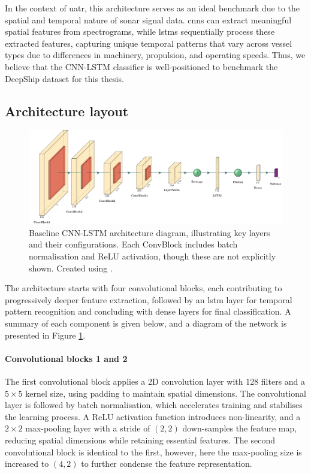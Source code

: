 In the context of \acrshort{uatr}, this architecture serves as an ideal benchmark due to the spatial and temporal nature of sonar signal data. \acrshort{cnn}s can extract meaningful spatial features from spectrograms, while \acrshort{lstm}s sequentially process these extracted features, capturing unique temporal patterns that vary across vessel types due to differences in machinery, propulsion, and operating speeds. Thus, we believe that the CNN-LSTM classifier is well-positioned to benchmark the DeepShip dataset for this thesis.

\subsection{Architecture layout}

\begin{figure}
    \centering
    \includegraphics[width=\linewidth]{img/ch3/architecture_diagram.pdf}
    \caption{Baseline CNN-LSTM architecture diagram, illustrating key layers and their configurations. Each ConvBlock includes batch normalisation and ReLU activation, though these are not explicitly shown. Created using \cite{haris_iqbal_plotneuralnet_2020}.}
    \label{fig:cnn-lstm-architecture}
\end{figure}

The architecture starts with four convolutional blocks, each contributing to progressively deeper feature extraction, followed by an \acrshort{lstm} layer for temporal pattern recognition and concluding with dense layers for final classification. A summary of each component is given below, and a diagram of the network is presented in Figure \ref{fig:cnn-lstm-architecture}.

\paragraph{Convolutional blocks 1 and 2} The first convolutional block applies a 2D convolution layer with 128 filters and a $5\times5$ kernel size, using padding to maintain spatial dimensions. The convolutional layer is followed by batch normalisation, which accelerates training and stabilises the learning process. A ReLU activation function introduces non-linearity, and a $2\times2$ max-pooling layer with a stride of $(2,2)$ down-samples the feature map, reducing spatial dimensions while retaining essential features. The second convolutional block is identical to the first, however, here the max-pooling size is increased to $(4,2)$ to further condense the feature representation.

